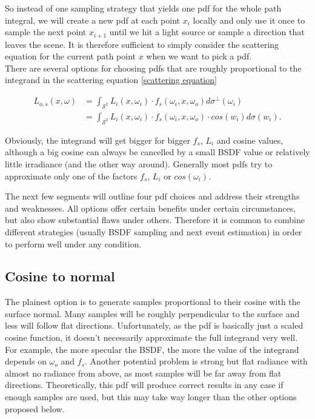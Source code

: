 So instead of one sampling strategy that yields one pdf for the whole path integral, we will create a new pdf at each point $x_i$ locally and only use it once to sample the next point $x_{i+1}$ until we hit a light source or sample a direction that leaves the scene. It is therefore sufficient to simply consider the scattering equation for the current path point $x$ when we want to pick a pdf.\\
There are several options for choosing pdfs that are roughly proportional to the integrand in the scattering equation \ref{scattering equation}

\begin{equation}
\label{scattering solid}
\begin{split}
L_{o,s}(x,\omega) &= \int_{\mathcal{S}^2}  L_i(x,\omega_i) \cdot f_s(\omega_i,x,\omega_o) d\sigma^\bot(\omega_i)\\
 &= \int_{\mathcal{S}^2}L_i(x,\omega_i) \cdot f_s(\omega_i,x,\omega_o) \cdot cos(w_i) d\sigma(w_i).
\end{split}
\end{equation}

Obviously, the integrand will get bigger for bigger $f_s$, $L_i$ and cosine values, although a big cosine can always be cancelled by a small BSDF value or relatively little irradiance (and the other way around).
Generally most pdfs try to approximate only one of the factors $f_s$, $L_i$ or $cos(\omega_i)$.

The next few segments will outline four pdf choices and address their strengths and weaknesses. All options offer certain benefits under certain circumstances, but also show substantial flaws under others. Therefore it is common to combine different strategies (usually BSDF sampling and next event estimation) in order to perform well under any condition. 

\subsection{Cosine to normal}
The plainest option is to generate samples proportional to their cosine with the surface normal. Many samples will be roughly perpendicular to the surface and less will follow flat directions.\newline
Unfortunately, as the pdf is basically just a scaled cosine function, it doesn't necessarily approximate the full integrand very well. For example, the more specular the BSDF, the more the value of the integrand depends on $\omega_o$ and $f_s$. Another potential problem is strong but flat radiance with almost no radiance from above, as most samples will be far away from flat directions.\newline
Theoretically, this pdf will produce correct results in any case if enough samples are used, but this may take way longer than the other options proposed below.


